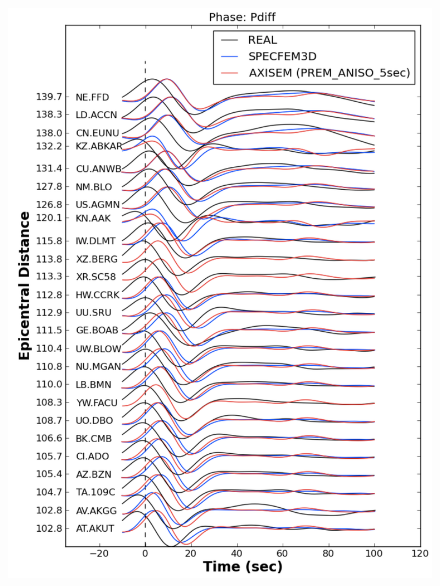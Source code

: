 \documentclass{article}
\begin{document}
\begin{figure}
\centering
\begin{minipage}{.5\textwidth}
  \centering
  \includegraphics[width=1.\linewidth]{AXISEMTutorial-fig010.pdf}
\end{minipage}%
\begin{minipage}{.5\textwidth}
  \centering

\end{minipage}
\end{figure}
\end{document}

